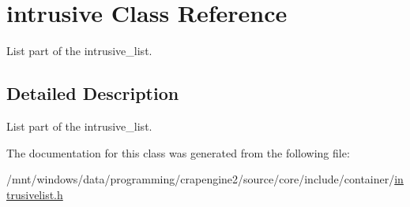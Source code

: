 \hypertarget{classintrusive}{\section{intrusive Class Reference}
\label{classintrusive}
}


List part of the intrusive\+\_\+list.  




\subsection{Detailed Description}
List part of the intrusive\+\_\+list. 

The documentation for this class was generated from the following file\+:\begin{DoxyCompactItemize}
\item 
/mnt/windows/data/programming/crapengine2/source/core/include/container/\hyperlink{intrusivelist_8h}{intrusivelist.\+h}\end{DoxyCompactItemize}
